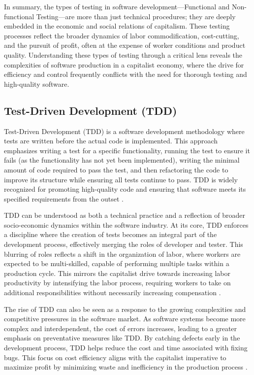 \begin{refsection}
In summary, the types of testing in software development—Functional and Non-functional Testing—are more than just technical procedures; they are deeply embedded in the economic and social relations of capitalism. These testing processes reflect the broader dynamics of labor commodification, cost-cutting, and the pursuit of profit, often at the expense of worker conditions and product quality. Understanding these types of testing through a critical lens reveals the complexities of software production in a capitalist economy, where the drive for efficiency and control frequently conflicts with the need for thorough testing and high-quality software.

\subsection{Test-Driven Development (TDD)}

Test-Driven Development (TDD) is a software development methodology where tests are written before the actual code is implemented. This approach emphasizes writing a test for a specific functionality, running the test to ensure it fails (as the functionality has not yet been implemented), writing the minimal amount of code required to pass the test, and then refactoring the code to improve its structure while ensuring all tests continue to pass. TDD is widely recognized for promoting high-quality code and ensuring that software meets its specified requirements from the outset \cite[pp.~17-25]{beck2003test}.

TDD can be understood as both a technical practice and a reflection of broader socio-economic dynamics within the software industry. At its core, TDD enforces a discipline where the creation of tests becomes an integral part of the development process, effectively merging the roles of developer and tester. This blurring of roles reflects a shift in the organization of labor, where workers are expected to be multi-skilled, capable of performing multiple tasks within a production cycle. This mirrors the capitalist drive towards increasing labor productivity by intensifying the labor process, requiring workers to take on additional responsibilities without necessarily increasing compensation \cite[pp.~118-123]{braverman1974labor}.

The rise of TDD can also be seen as a response to the growing complexities and competitive pressures in the software market. As software systems become more complex and interdependent, the cost of errors increases, leading to a greater emphasis on preventative measures like TDD. By catching defects early in the development process, TDD helps reduce the cost and time associated with fixing bugs. This focus on cost efficiency aligns with the capitalist imperative to maximize profit by minimizing waste and inefficiency in the production process \cite[pp.~198-204]{fowler2010refactoring}.


\end{refsection}
